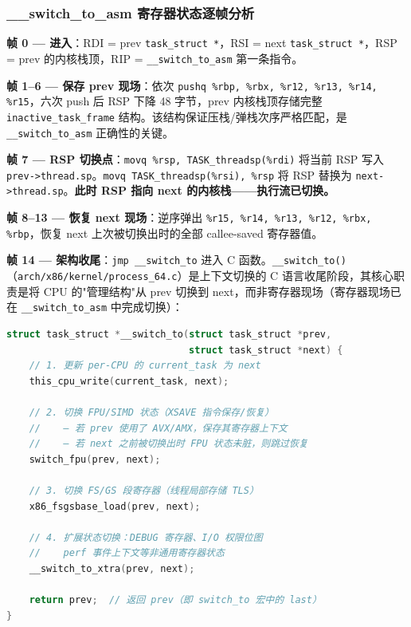 \documentclass[a4paper]{article}
\begin{document}
\subsubsection{\_\_switch\_to\_asm 寄存器状态逐帧分析}

\textbf{帧 0 — 进入}：RDI = prev \texttt{task\_struct *}，RSI = next \texttt{task\_struct *}，RSP = prev 的内核栈顶，RIP = \texttt{\_\_switch\_to\_asm} 第一条指令。

\textbf{帧 1–6 — 保存 prev 现场}：依次 \texttt{pushq \%rbp, \%rbx, \%r12, \%r13, \%r14, \%r15}，六次 push 后 RSP 下降 48 字节，prev 内核栈顶存储完整 \texttt{inactive\_task\_frame} 结构。该结构保证压栈/弹栈次序严格匹配，是 \texttt{\_\_switch\_to\_asm} 正确性的关键。

\textbf{帧 7 — RSP 切换点}：\texttt{movq \%rsp, TASK\_threadsp(\%rdi)} 将当前 RSP 写入 \texttt{prev->thread.sp}。\texttt{movq TASK\_threadsp(\%rsi), \%rsp} 将 RSP 替换为 \texttt{next->thread.sp}。\textbf{此时 RSP 指向 next 的内核栈——执行流已切换。}

\textbf{帧 8–13 — 恢复 next 现场}：逆序弹出 \texttt{\%r15, \%r14, \%r13, \%r12, \%rbx, \%rbp}，恢复 next 上次被切换出时的全部 callee-saved 寄存器值。

\textbf{帧 14 — 架构收尾}：\texttt{jmp \_\_switch\_to} 进入 C 函数。\texttt{\_\_switch\_to()}（\texttt{arch/x86/kernel/process\_64.c}）是上下文切换的 C 语言收尾阶段，其核心职责是将 CPU 的"管理结构"从 prev 切换到 next，而非寄存器现场（寄存器现场已在 \texttt{\_\_switch\_to\_asm} 中完成切换）：

\begin{lstlisting}[language=C, caption={\_\_switch\_to C 语言收尾（arch/x86/kernel/process\_64.c）}, label={lst:__switch_to_c}]
struct task_struct *__switch_to(struct task_struct *prev,
                                struct task_struct *next) {
    // 1. 更新 per-CPU 的 current_task 为 next
    this_cpu_write(current_task, next);

    // 2. 切换 FPU/SIMD 状态（XSAVE 指令保存/恢复）
    //    — 若 prev 使用了 AVX/AMX，保存其寄存器上下文
    //    — 若 next 之前被切换出时 FPU 状态未脏，则跳过恢复
    switch_fpu(prev, next);

    // 3. 切换 FS/GS 段寄存器（线程局部存储 TLS）
    x86_fsgsbase_load(prev, next);

    // 4. 扩展状态切换：DEBUG 寄存器、I/O 权限位图
    //    perf 事件上下文等非通用寄存器状态
    __switch_to_xtra(prev, next);

    return prev;  // 返回 prev（即 switch_to 宏中的 last）
}
\end{lstlisting}
\end{document}
